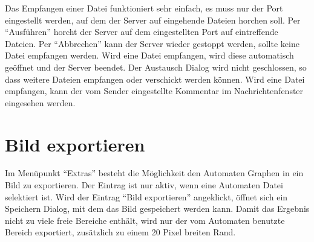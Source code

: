 Das Empfangen einer Datei funktioniert sehr einfach, es muss nur der Port
eingestellt werden, auf dem der Server auf eingehende Dateien horchen soll. Per
"`Ausführen"' horcht der Server auf dem eingestellten Port auf eintreffende
Dateien. Per "`Abbrechen"' kann der Server wieder gestoppt werden, sollte keine
Datei empfangen werden. Wird eine Datei empfangen, wird diese automatisch
geöffnet und der Server beendet. Der Austausch Dialog wird nicht geschlossen, so
dass weitere Dateien empfangen oder verschickt werden können. Wird eine Datei
empfangen, kann der vom Sender eingestellte Kommentar im Nachrichtenfenster
eingesehen werden.


\section{Bild exportieren}

Im Menüpunkt "`Extras"' besteht die Möglichkeit den Automaten Graphen in ein
Bild zu exportieren. Der Eintrag ist nur aktiv, wenn eine Automaten Datei
selektiert ist. Wird der Eintrag "`Bild exportieren"' angeklickt, öffnet sich
ein Speichern Dialog, mit dem das Bild gespeichert werden kann. Damit das
Ergebnis nicht zu viele freie Bereiche enthält, wird nur der vom Automaten
benutzte Bereich exportiert, zusätzlich zu einem 20 Pixel breiten Rand.